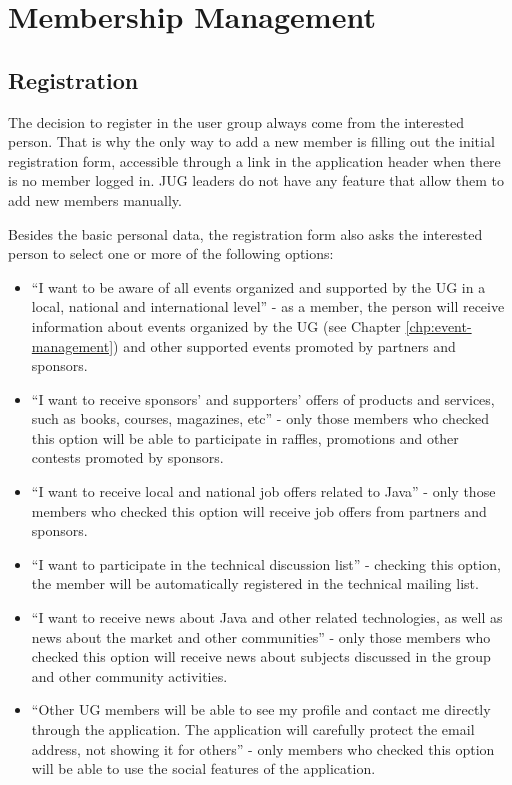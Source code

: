 \documentclass[envcountsame,envcountchap]{svmono}
\begin{document}
\chapter{Membership Management}

\section{Registration}

The decision to register in the user group always come from the interested person. That is why the only way to add a new member is filling out the initial registration form, accessible through a link in the application header when there is no member logged in. JUG leaders do not have any feature that allow them to add new members manually.

Besides the basic personal data, the registration form also asks the interested person to select one or more of the following options:

\begin{itemize}
\item ``I want to be aware of all events organized and supported by the UG in a local, national and international level'' - as a member, the person will receive information about events organized by the UG (see Chapter \ref{chp:event-management}) and other supported events promoted by partners and sponsors.

\item ``I want to receive sponsors' and supporters' offers of products and services, such as books, courses, magazines, etc'' - only those members who checked this option will be able to participate in raffles, promotions and other contests promoted by sponsors.

\item ``I want to receive local and national job offers related to Java'' - only those members who checked this option will receive job offers from partners and sponsors.

\item ``I want to participate in the technical discussion list'' - checking this option, the member will be automatically registered in the technical mailing list.

\item ``I want to receive news about Java and other related technologies, as well as news about the market and other communities'' - only those members who checked this option will receive news about subjects discussed in the group and other community activities.

\item ``Other UG members will be able to see my profile and contact me directly through the application. The application will carefully protect the email address, not showing it for others'' - only members who checked this option will be able to use the social features of the application.
\end{itemize}
\end{document}
